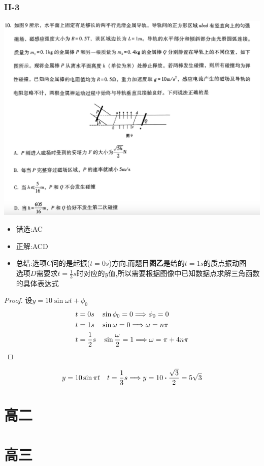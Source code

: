 \documentclass{article}
\begin{document}
        \subsubsection{II-3}
        \includegraphics[width=50em,keepaspectratio]{./pictures/1.3-3.png}
    
        \begin{itemize}
            \item 错选:\quad AC
            \item 正解:\quad ACD
            \item 总结:\quad 选项$C$问的是起振($t=0s$)方向,而题目\textbf{图乙}是给的$t=1s$的质点振动图\\
                            选项$D$需要求$t=\frac{1}{3}s$时对应的$y$值,所以需要根据图像中已知数据点求解三角函数的具体表达式
        \end{itemize}
    
            \begin{proof}
                设$ y = 10 \sin{\omega t + \phi_{0}}$
                \begin{align*}
                    t &= 0s \quad \sin{\phi_{0}} = 0 \Longrightarrow \phi_{0} = 0   \\
                    t &= 1s \quad \sin{\omega} = 0 \Longrightarrow \omega = n\pi    \\
                    t &= \frac{1}{2}s \quad \sin{\frac{\omega}{2}} = 1 \Longrightarrow \omega = \pi + 4n\pi
                \end{align*}
            \end{proof}
            $$
            y = 10\sin{\pi t} \quad t = \frac{1}{3}s \lra y = 10 \vdot \frac{\sqrt{3}}{2} = 5\sqrt{3}
            $$

    
    


    \section{高二}





    \section{高三}
\end{document}
